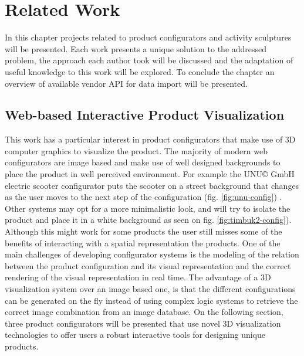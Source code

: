 \documentclass[medieninformatik-arbeit.tex]{subfiles}
\begin{document}
\label{ch:related}
\section{Related Work}
In this chapter projects related to product configurators and activity
sculptures will be presented. Each work presents a unique solution to the addressed problem, 
the approach each author took will be discussed and the adaptation of useful knowledge to this
work will be explored. To conclude the chapter an overview of available vendor
API for data import will be presented. 

\subsection{Web-based Interactive Product Visualization}
This work has a particular interest in product configurators that make use of 3D
computer graphics to visualize the product. The majority of modern web
configurators are image based and make use of well designed backgrounds to place the
product in well perceived environment. For example the UNU\copyright{} GmbH electric scooter
configurator puts the scooter on a street background that
changes as the user moves to the next step of the configuration (fig. \ref{fig:unu-config})
. Other systems may opt for a more minimalistic look, and will try to isolate the product and place it in a white background as seen on fig. \ref{fig:timbuk2-config}). 
Although this might work for some products the user still misses some of the benefits of
interacting with a spatial representation the products\cite{vande2009analyzing}.
One of the main challenges of developing  configurator systems is the modeling
of the relation between the product configuration and its visual representation
and the correct rendering of the visual representation in real
time\cite{feliceinteractive}. The advantage of a 3D visualization system
over an image based one, is that the different configurations can be generated on
the fly instead of using complex logic systems to retrieve the correct image
combination from an image database. On the following section, three product configurators will be presented that use novel 3D visualization technologies to offer users a robust interactive tools for designing unique products.
\end{document}
